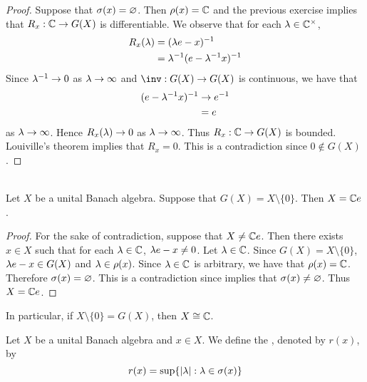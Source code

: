 \documentclass{book}
\begin{document}
\begin{proof}
	Suppose that $\sigma(x) = \varnothing$. Then $\rho(x) = \mathbb{C}$ and the previous exercise implies that $R_x: \mathbb{C} \rightarrow G(X)$ is differentiable. We observe that for each $\lambda \in \mathbb{C}^{\times}$, 
	\begin{align*}
		R_x(\lambda)
		& = (\lambda e - x)^{-1} \\
		& = \lambda^{-1} (e - \lambda^{-1}x)^{-1} \\
	\end{align*} 
	Since $\lambda^{-1} \rightarrow 0$ as $\lambda \rightarrow \infty$ and $\inv: G(X) \rightarrow G(X)$ is continuous, we have that
	\begin{align*}
		(e - \lambda^{-1}x)^{-1}
		& \rightarrow e^{-1} \\
		&= e
	\end{align*}
	as $\lambda \rightarrow \infty$. Hence $R_x(\lambda) \rightarrow 0$ as $\lambda \rightarrow \infty$. Thus $R_x: \mathbb{C} \rightarrow G(X)$ is bounded. Louiville's theorem implies that $R_x = 0$. This is a contradiction since $0 \not \in G(X)$.   
\end{proof}

\begin{ex}  \\
	Let $X$ be a unital Banach algebra. Suppose that $G(X) = X \setminus \{0\}$. Then $X = \mathbb{C} e$. 
\end{ex}

\begin{proof}
	For the sake of contradiction, suppose that $X \neq \mathbb{C} e$. Then there exists $x \in X$ such that for each $\lambda \in \mathbb{C}$, $\lambda e - x \neq 0$. Let $\lambda \in \mathbb{C}$. Since $G(X) = X \setminus \{0\}$, $\lambda e - x \in G(X)$ and $\lambda \in \rho(x)$. Since $\lambda \in \mathbb{C}$ is arbitrary, we have that $\rho(x) = \mathbb{C}$. Therefore $\sigma(x) = \varnothing$. This is a contradiction since \rex{}  implies that $\sigma(x) \neq \varnothing$. Thus $X = \mathbb{C} e$. 
\end{proof}

\begin{note}
	In particular, if $X \setminus \{0\} = G(X)$, then $X \cong \mathbb{C}$.
\end{note}

	\begin{defn}
		Let $X$ be a unital Banach algebra and $x \in X$. We define the , denoted by $r(x)$, by $$r(x) = \sup \{|\lambda|: \lambda \in \sigma(x)\}$$
	\end{defn}
\end{document}
